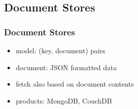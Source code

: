 \documentclass[dvipsnames]{beamer}
\theoremstyle{plain}
\begin{document}
\subsection{Document Stores}

\begin{frame}
  \frametitle{Document Stores}

  \begin{itemize}
    \item model: (key, document) pairs
    \item document: JSON formatted data
    \item fetch also based on document contents
    \item products: MongoDB, CouchDB
  \end{itemize}
\end{frame}
\end{document}
